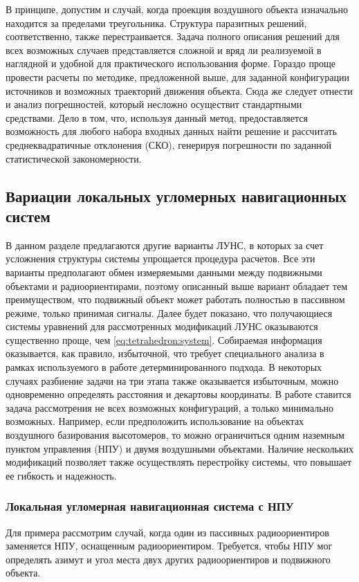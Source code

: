 \documentclass[../main.tex]{subfiles}
\begin{document}
В принципе, допустим и случай, когда проекция воздушного объекта изначально находится за пределами треугольника. Структура паразитных решений, соответственно, также перестраивается. Задача полного описания решений для всех возможных случаев представляется сложной и вряд ли реализуемой в наглядной и удобной для практического использования форме. Гораздо проще провести расчеты по методике, предложенной выше, для заданной конфигурации источников и возможных траекторий движения объекта. Сюда же следует отнести и анализ погрешностей, который несложно осуществит стандартными средствами. Дело в том, что, используя данный метод, предоставляется возможность для любого набора входных данных найти решение и рассчитать среднеквадратичные отклонения (СКО), генерируя погрешности по заданной статистической закономерности.

%
%
\subsection{Вариации локальных угломерных навигационных систем}
В данном разделе предлагаются другие варианты ЛУНС, в которых за счет усложнения структуры системы упрощается процедура расчетов. Все эти варианты предполагают обмен измеряемыми данными между подвижными объектами и радиоориентирами, поэтому описанный выше вариант обладает тем преимуществом, что подвижный объект может работать полностью в пассивном режиме, только принимая сигналы. Далее будет показано, что получающиеся системы уравнений для рассмотренных модификаций ЛУНС оказываются существенно проще, чем \eqref{eq:tetrahedron:system}. Собираемая информация оказывается, как правило, избыточной, что требует специального анализа в рамках используемого в работе детерминированного подхода. В некоторых случаях разбиение задачи на три этапа также оказывается избыточным, можно одновременно определять расстояния и декартовы координаты. В работе ставится задача рассмотрения не всех возможных конфигураций, а только минимально возможных. Например, если предположить использование на объектах воздушного базирования высотомеров, то можно ограничиться одним наземным пунктом управления (НПУ) и двумя воздушными объектами. Наличие нескольких модификаций позволяет также осуществлять перестройку системы, что повышает ее гибкость и надежность.

\subsubsection{Локальная угломерная навигационная система с НПУ}
Для примера рассмотрим случай, когда один из пассивных радиоориентиров заменяется НПУ, оснащенным радиоориентиром. Требуется, чтобы НПУ мог определять азимут и угол места двух других радиоориентиров и подвижного объекта.
\end{document}

